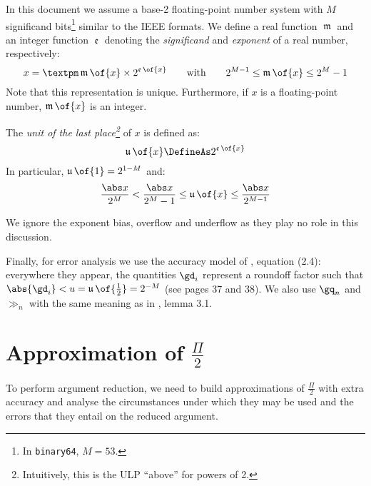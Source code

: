 \documentclass[10pt, a4paper, twoside]{basestyle}
\DeclareMathOperator{\ULP}{\mathfrak u}
\DeclareMathOperator{\mant}{\mathfrak m}
\DeclareMathOperator{\expn}{\mathfrak e}
\begin{document}
In this document we assume a base-2 floating-point number system with $M$ significand bits\footnote{In \texttt{binary64}, $M = 53$.} similar to the IEEE formats.  We define a real  function $\mant$ and an integer function $\expn$ denoting the \emph{significand} and \emph{exponent} of a real number, respectively:
\[
x = ±\mant\of{x} \times 2^{\expn\of{x}} \qquad\text{with}\qquad 2^{M-1} \leq \mant\of{x} \leq 2^M - 1
\]
Note that this representation is unique.  Furthermore, if $x$ is a floating-point number, $\mant\of{x}$ is an integer.

The \emph{unit of the last place\footnote{Intuitively, this is the ULP ``above'' for powers of 2.}} of $x$ is defined as:
\[
\ULP\of{x} \DefineAs 2^{\expn\of{x}}
\]
In particular, $\ULP\of{1} = 2^{1 - M}$ and:
\begin{equation}
\frac{\abs x}{2^M} < \frac{\abs x}{2^M - 1} \leq \ULP\of{x} \leq \frac{\abs x}{2^{M - 1}}
\label{eqnulp}
\end{equation}

We ignore the exponent bias, overflow and underflow as they play no role in this discussion.

Finally, for error analysis we use the accuracy model of \cite{Higham2002}, equation (2.4): everywhere they appear, the quantities $\gd_i$ represent a roundoff factor such that $\abs{\gd_i} < u = \ULP\of{\frac{1}{2}} = 2^{-M}$ (see pages 37 and 38).  We also use $\gq_n$ and $\gg_n$ with the same meaning as in \cite{Higham2002}, lemma 3.1.

\section*{Approximation of $\frac{\Pi}{2}$}

To perform argument reduction, we need to build approximations of $\frac{\Pi}{2}$ with extra accuracy and analyse the circumstances under which they may be used and the errors that they entail on the reduced argument.
\end{document}
